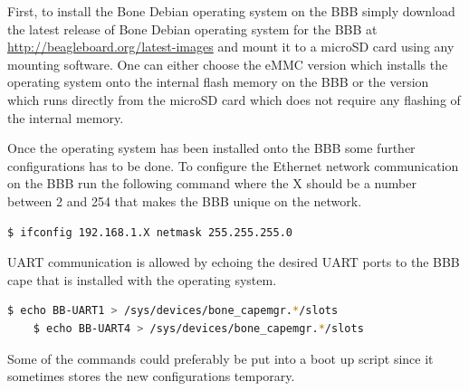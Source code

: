 First, to install the Bone Debian operating system on the BBB simply download the latest release of Bone Debian operating system for the BBB at \url{http://beagleboard.org/latest-images} and mount it to a microSD card using any mounting software. One can either choose the eMMC version which installs the operating system onto the internal flash memory on the BBB or the version which runs directly from the microSD card which does not require any flashing of the internal memory.

Once the operating system has been installed onto the BBB some further configurations has to be done.
To configure the Ethernet network communication on the BBB run the following command where the X should be a number between 2 and 254 that makes the BBB unique on the network.
\begin{lstlisting}[language=bash]
  $ ifconfig 192.168.1.X netmask 255.255.255.0
\end{lstlisting}

UART communication is allowed by echoing the desired UART ports to the BBB cape that is installed with the operating system.
\begin{lstlisting}[language=bash]
	$ echo BB-UART1 > /sys/devices/bone_capemgr.*/slots
	$ echo BB-UART4 > /sys/devices/bone_capemgr.*/slots
\end{lstlisting}

Some of the commands could preferably be put into a boot up script since it sometimes stores the new configurations temporary.

